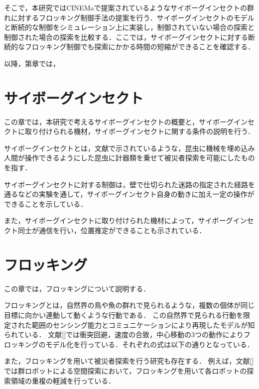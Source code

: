\documentclass[a4paper,11pt]{jarticle}
\begin{document}
	そこで，本研究ではCINEMaで提案されているようなサイボーグインセクトの群れに対するフロッキング制御手法の提案を行う．サイボーグインセクトのモデルと断続的な制御をシミュレーション上に実装し，制御されていない場合の探索と制御された場合の探索を比較する．ここでは，サイボーグインセクトに対する断続的なフロッキング制御でも探索にかかる時間の短縮ができることを確認する．
	
	以降，第章では，
	\section{サイボーグインセクト}
	この章では，本研究で考えるサイボーグインセクトの概要と，サイボーグインセクトに取り付けられる機材，サイボーグインセクトに関する条件の説明を行う．
	
	サイボーグインセクトとは，文献\cite{CyborgInsect}で示されているような，昆虫に機械を埋め込み人間が操作できるようにした昆虫に計器類を乗せて被災者探索を可能にしたものを指す．
	
	サイボーグインセクトに対する制御は，壁で仕切られた迷路の指定された経路を通るなどの実験を通して，サイボーグインセクト自身の動きに加え一定の操作ができることを示している\cite{CINEMa}．
	
	また，サイボーグインセクトに取り付けられた機材によって，サイボーグインセクト同士が通信を行い，位置推定ができることも示されている\cite{CINEMa}．
	\section{フロッキング}
	この章では，フロッキングについて説明する．
	
	フロッキングとは，自然界の鳥や魚の群れで見られるような，複数の個体が同じ目標に向かい連動して動くような行動である．
	この自然界で見られる行動を限定された範囲のセンシング能力とコミュニケーションにより再現したモデルが知られている．
	文献[]では衝突回避，速度の合致，中心移動の3つの動作によりフロッキングのモデル化を行っている．それぞれの式は以下の通りとなっている．
	
	また，フロッキングを用いて被災者探索を行う研究も存在する．
	例えば，文献[]では群ロボットによる空間探索において，フロッキングを用いて各ロボットの探索領域の重複の軽減を行っている．	
\end{document}
